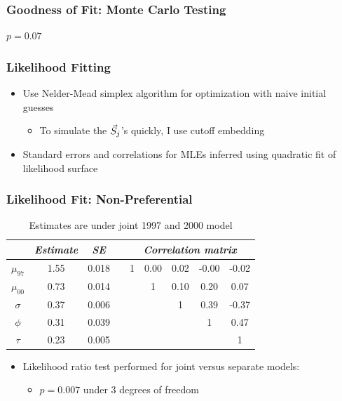 \documentclass[xcolor=svgnames]{beamer}
\begin{document}
\begin{frame}
\frametitle{Goodness of Fit: Monte Carlo Testing}
\begin{figure}
\centering
{}
\end{figure}
$p=0.07$
\end{frame}
\begin{frame}
\frametitle{Likelihood Fitting}
\begin{itemize}
\item Use Nelder-Mead \citep{nelderMead} simplex algorithm for optimization with naive initial guesses
\begin{itemize}
\item To simulate the $\vec{S}_j$'s quickly, I use cutoff embedding \citep{gneiting2012}
\end{itemize}
\item Standard errors and correlations for MLEs inferred using quadratic fit of likelihood surface
\end{itemize}

\end{frame}
\begin{frame}
\frametitle{Likelihood Fit: Non-Preferential}
\begin{table}
\centering
\begin{tabular}{ccccccccc}
\hline
&  \emph{Estimate} & \emph{SE} & & \multicolumn{5}{c}{\emph{Correlation matrix}}  \\ 
\hline
$\mu_{97}$ & 1.55 & 0.018 &  & 1 & 0.00 & 0.02 & -0.00 & -0.02 \\ 
$\mu_{00}$ & 0.73 & 0.014 & &  & 1 & 0.10 & 0.20 & 0.07 \\ 
$\sigma$ & 0.37 & 0.006 & & &  & 1 & 0.39 & -0.37 \\ 
$\phi$ & 0.31 & 0.039 & &  &  &  & 1 & 0.47 \\ 
$\tau$ & 0.23 & 0.005 & & &  & &  & 1 \\ 
\hline
\end{tabular}
\caption{Estimates are under joint 1997 and 2000 model}
\end{table}

\begin{itemize}
\item Likelihood ratio test performed for joint versus separate models:
\begin{itemize}
\item $p=0.007$ under 3 degrees of freedom
\end{itemize}
\end{itemize}

\end{frame}
\end{document}
